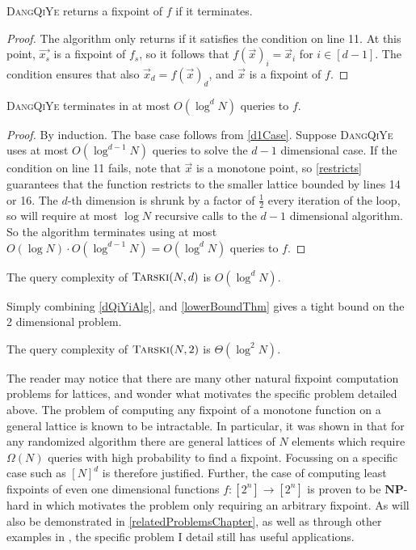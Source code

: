 \begin{lemma}
  \textsc{DangQiYe} returns a fixpoint of $f$ if it terminates.
\end{lemma}
\begin{proof}
  The algorithm only returns if it satisfies the condition on line 11. At this point, $\vec{x_s}$ is a fixpoint
  of $f_s$, so it follows that $f(\vec{x})_i = \vec{x}_i$ for $i \in [d-1]$. The condition ensures
  that also $\vec{x}_d = f(\vec{x})_d$, and $\vec{x}$ is a fixpoint of $f$.
\end{proof}
\begin{lemma}
  \textsc{DangQiYe} terminates in at most $O(\log^d N)$ queries to $f$.
\end{lemma}
\begin{proof}
  By induction. The base case follows from \cref{d1Case}. Suppose \textsc{DangQiYe} uses at most
  $O(\log^{d-1}N)$ queries to solve the $d-1$ dimensional case. If the condition
  on line 11 fails, note that $\vec{x}$ is a monotone point, so \cref{restricts} guarantees
  that the function restricts to the smaller lattice bounded by lines 14 or 16.
  The $d$-th dimension is shrunk by a factor of $\frac{1}{2}$ every iteration of the loop,
  so will require at most $\log N$ recursive calls to the $d-1$ dimensional algorithm.
  So the algorithm terminates using at most $O(\log N) \cdot O(\log^{d-1} N) = O(\log^d N)$ queries to $f$.
\end{proof}
\begin{theorem}
  The query complexity of $\textsc{Tarski}(N, d)$ is $O(\log^d N)$.
\end{theorem}
Simply combining \cref{dQiYiAlg}, and \cref{lowerBoundThm} gives a tight
bound on the 2 dimensional problem.
\begin{cor} 
  The query complexity of $\textsc{Tarski}(N, 2)$ is $\Theta(\log^2 N)$.
\end{cor}
\begin{remark}
  The reader may notice that there are many other natural fixpoint computation
  problems for lattices, and wonder what motivates the specific problem detailed above.
  The problem of computing any fixpoint of a monotone function on a general lattice
  is known to be intractable. In particular, it was shown in \citep{changComplexity}
  that for any randomized algorithm there are general lattices of $N$ elements 
  which require $\Omega(N)$ queries with high probability to find a fixpoint.
  Focussing on a specific case such as $[N]^d$ is therefore justified.
  Further, the case of computing least fixpoints of even one dimensional
  functions $f : [2^n] \to [2^n]$ is proven to be $\mathbf{NP}$-hard in \citep{lowerBound}
  which motivates the problem only requiring an arbitrary fixpoint. As will also be demonstrated
  in \cref{relatedProblemsChapter}, as well as through other examples in \citep{lowerBound},
  the specific problem I detail still has useful applications.
\end{remark}
